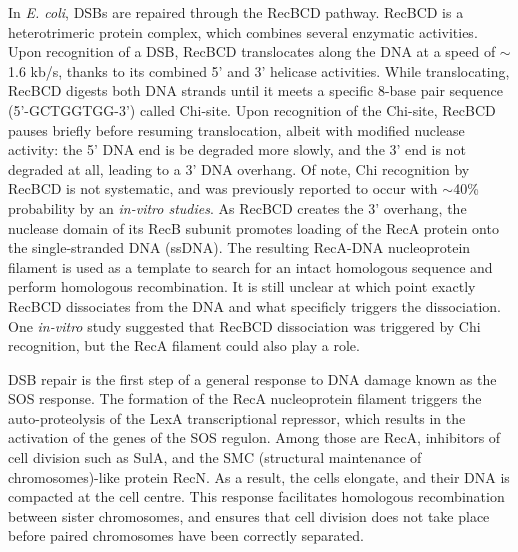 In \emph{E. coli}, DSBs are repaired through the RecBCD pathway. RecBCD is a heterotrimeric protein complex, which combines several enzymatic activities\cite{Dillingham2008}. Upon recognition of a DSB, RecBCD translocates along the DNA at a speed of $\sim$1.6 kb/s, thanks to its combined 5' and 3' helicase activities\cite{Wiktor2018}. While translocating, RecBCD digests both DNA strands until it meets a specific 8-base pair sequence (5'-GCTGGTGG-3') called Chi-site. Upon recognition of the Chi-site, RecBCD pauses briefly before resuming translocation, albeit with modified nuclease activity: the 5' DNA end is be degraded more slowly, and the 3' end is not degraded at all, leading to a 3' DNA overhang. Of note, Chi recognition by RecBCD is not systematic, and was previously reported to occur with $\sim$40\% probability by an \emph{in-vitro studies}\cite{Taylor1992}. As RecBCD creates the 3' overhang, the nuclease domain of its RecB subunit promotes loading of the RecA protein onto the single-stranded DNA (ssDNA)\cite{Churchill2000, Spies2006}. The resulting RecA-DNA nucleoprotein filament is used as a template to search for an intact homologous sequence and perform homologous recombination. It is still unclear at which point exactly RecBCD dissociates from the DNA and what specificly triggers the dissociation. One \emph{in-vitro} study suggested that RecBCD dissociation was triggered by Chi recognition\cite{Taylor1999}, but the RecA filament could also play a role.

DSB repair is the first step of a general response to DNA damage known as the SOS response\cite{Baharoglu2014}. The formation of the RecA nucleoprotein filament triggers the auto-proteolysis of the LexA transcriptional repressor, which results in the activation of the genes of the SOS regulon. Among those are RecA, inhibitors of cell division such as SulA, and the SMC (structural maintenance of chromosomes)-like protein RecN. As a result, the cells elongate\cite{Bos2015}, and their DNA is compacted at the cell centre\cite{Odsbu2014}. This response facilitates homologous recombination between sister chromosomes, and ensures that cell division does not take place before paired chromosomes have been correctly separated.


